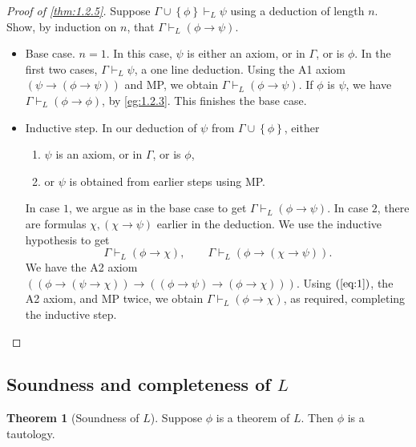 \documentclass{article}
\newcommand{\rb}[1]{\left( #1 \right)}
\newcommand{\cb}[1]{\left\{ #1 \right\}}
\newcommand{\impb}[2]{\rb{#1 \rightarrow #2}}
\theoremstyle{definition}\newtheorem{definition}{Definition}[subsection]
\theoremstyle{definition}\newtheorem{remark1}[definition]{Remark}
\theoremstyle{definition}\newtheorem{example1}[definition]{Example}
\theoremstyle{definition}\newtheorem*{remark2}{Remark}
\theoremstyle{definition}\newtheorem*{example2}{Example}
\theoremstyle{definition}\newtheorem*{note}{Note}
\theoremstyle{definition}\newtheorem*{notation}{Notation}
\newtheorem{theorem}[definition]{Theorem}
\begin{document}
\begin{proof}[Proof of \ref{thm:1.2.5}]
Suppose $ \Gamma \cup \cb{\phi} \vdash_L \psi $ using a deduction of length $ n $. Show, by induction on $ n $, that $ \Gamma \vdash_L \impb{\phi}{\psi} $.
\begin{itemize}
\item Base case. $ n = 1 $. In this case, $ \psi $ is either an axiom, or in $ \Gamma $, or is $ \phi $. In the first two cases, $ \Gamma \vdash_L \psi $, a one line deduction. Using the A1 axiom $ \impb{\psi}{\impb{\phi}{\psi}} $ and MP, we obtain $ \Gamma \vdash_L \impb{\phi}{\psi} $. If $ \phi $ is $ \psi $, we have $ \Gamma \vdash_L \impb{\phi}{\phi} $, by \ref{eg:1.2.3}. This finishes the base case.
\item Inductive step. In our deduction of $ \psi $ from $ \Gamma \cup \cb{\phi} $, either
\begin{enumerate}[leftmargin=0.5in, label=Case \arabic*.]
\item $ \psi $ is an axiom, or in $ \Gamma $, or is $ \phi $,
\item or $ \psi $ is obtained from earlier steps using MP.
\end{enumerate}
In case $ 1 $, we argue as in the base case to get $ \Gamma \vdash_L \impb{\phi}{\psi} $. In case $ 2 $, there are formulas $ \chi, \impb{\chi}{\psi} $ earlier in the deduction. We use the inductive hypothesis to get
\begin{equation}
\label{eq:1}
\Gamma \vdash_L \impb{\phi}{\chi}, \qquad \Gamma \vdash_L \impb{\phi}{\impb{\chi}{\psi}}.
\end{equation}
We have the A2 axiom $ \impb{\impb{\phi}{\impb{\psi}{\chi}}}{\impb{\impb{\phi}{\psi}}{\impb{\phi}{\chi}}} $. Using $ \rb{\ref{eq:1}} $, the A2 axiom, and MP twice, we obtain $ \Gamma \vdash_L \impb{\phi}{\chi} $, as required, completing the inductive step.
\end{itemize}
\end{proof}


\subsection{Soundness and completeness of $ L $}

\begin{theorem}[Soundness of $ L $]
\label{thm:1.3.1}
Suppose $ \phi $ is a theorem of $ L $. Then $ \phi $ is a tautology.
\end{theorem}
\end{document}
